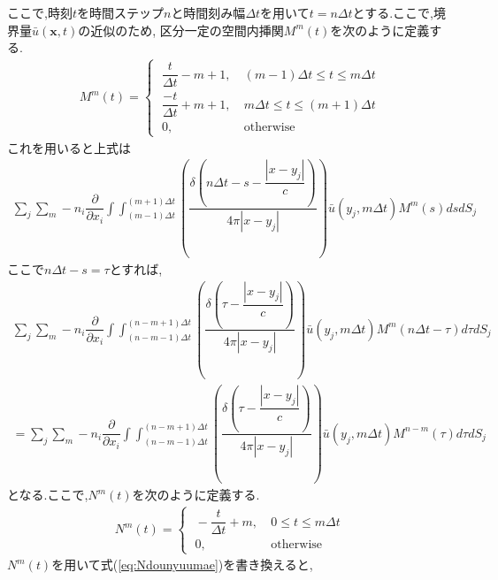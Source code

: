 \documentclass[dvipdfmx]{ampbt}
\begin{document}
ここで,時刻$t$を時間ステップ$n$と時間刻み幅$\Delta t$を用いて$t=n\Delta t$とする.ここで,境界量$\bar{u}(\bm{x},t)$の近似のため,
区分一定の空間内挿関$M^m(t)$を次のように定義する.
\begin{align}
  M^m(t) =
\begin{cases}
\; \dfrac{t}{\Delta t}-m+1,&\ (m-1)\Delta t \leq t \leq m\Delta t  \\
\; \dfrac{-t}{\Delta t}+m+1,&\ m\Delta t \leq t \leq (m+1)\Delta t  \\
\; 0, &\ \mbox{otherwise}
\end{cases}
\end{align}
これを用いると上式は
\begin{align}
\sum_j \sum_m -n_i\dfrac{\partial}{\partial x_i}\int\!\!\!\int_{(m-1)\Delta t }^{(m+1)\Delta t} \left( \dfrac{\delta(n\Delta t-s-\dfrac{|x-y_j|}{c})}{4\pi|x-y_j|} \right) \bar{u}(y_j,m\Delta t)M^m(s)dsdS_j
\end{align}
ここで$n\Delta t-s = \tau$とすれば,
\begin{align}
\sum_j \sum_m -n_i\dfrac{\partial}{\partial x_i}\int\!\!\!\int_{(n-m-1)\Delta t }^{(n-m+1)\Delta t} \left( \dfrac{\delta(\tau- \dfrac{|x-y_j|}{c})}{4\pi|x-y_j|} \right) \bar{u}(y_j,m\Delta t)M^m(n\Delta t - \tau)d\tau dS_j \nonumber \\
\label{eq:Ndounyuumae}
= \sum_j \sum_m -n_i\dfrac{\partial}{\partial x_i}\int\!\!\!\int_{(n-m-1)\Delta t }^{(n-m+1)\Delta t} \left( \dfrac{\delta(\tau- \dfrac{|x-y_j|}{c})}{4\pi|x-y_j|} \right) \bar{u}(y_j,m\Delta t)M^{n-m}(\tau)d\tau dS_j
\end{align}
となる.ここで,$N^m(t)$を次のように定義する.
\begin{align}
  N^m(t) =
\begin{cases}
\; -\dfrac{t}{\Delta t}+m,&\ 0 \leq t \leq m\Delta t  \\
\; 0, &\ \mbox{otherwise}
\end{cases}
\end{align}
$N^m(t)$を用いて式(\ref{eq:Ndounyuumae})を書き換えると,
\end{document}
